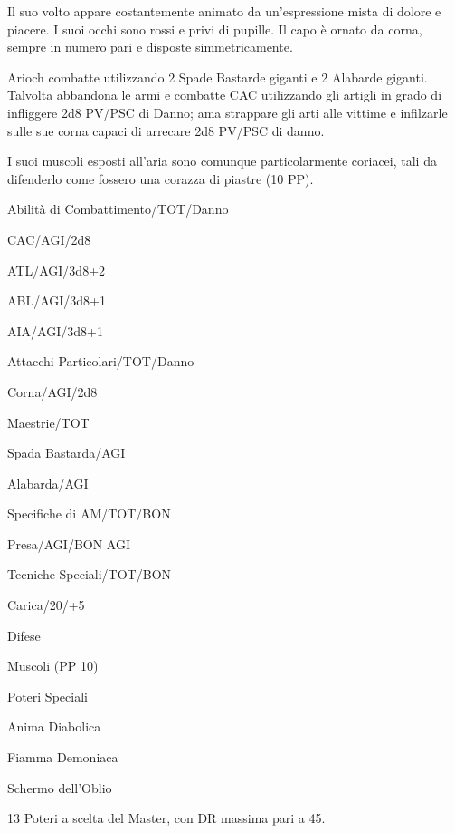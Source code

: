 Il suo volto appare costantemente animato da un'espressione mista di
dolore e piacere. I suoi occhi sono rossi e privi di pupille.  Il capo
\`e ornato da corna, sempre in numero pari e disposte
simmetricamente.

Arioch combatte utilizzando 2 Spade Bastarde giganti e 2 Alabarde
giganti. Talvolta abbandona le armi e combatte CAC utilizzando gli
artigli in grado di infliggere 2d8 PV/\-PSC di Danno; ama strappare
gli arti alle vittime e infilzarle sulle sue corna capaci di arrecare
2d8 PV/\-PSC di danno.

I suoi muscoli esposti all'aria sono comunque particolarmente
coriacei, tali da difenderlo come fossero una corazza di piastre (10
PP).


\begin{parmostro}{Abilit\`a di Combattimento/TOT/Danno}
\item CAC/AGI/2d8 
\item ATL/AGI/3d8+2 
\item ABL/AGI/3d8+1
\item AIA/AGI/3d8+1
\end{parmostro}

\begin{parmostro}{Attacchi Particolari/TOT/Danno}
\item Corna/AGI/2d8
\end{parmostro}

\begin{parmostro}{Maestrie/TOT} 
\item Spada Bastarda/AGI 
\item Alabarda/AGI
\end{parmostro}

\begin{parmostro}{Specifiche di AM/TOT/BON} 
\item Presa/AGI/BON AGI
\end{parmostro}

\begin{parmostro}{Tecniche Speciali/TOT/BON} 
\item Carica/20/+5
\end{parmostro}

\begin{parmostro}{Difese}
\item Muscoli (PP 10)
\end{parmostro}

\begin{parmostro}{Poteri Speciali}
\item Anima Diabolica
\item Fiamma Demoniaca
\item Schermo dell'Oblio
\item 13 Poteri a scelta del Master, con DR massima pari a 45.
\end{parmostro}

